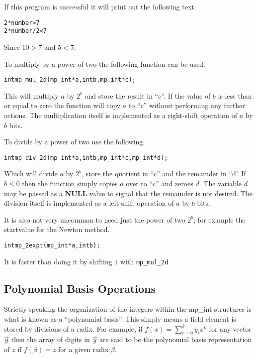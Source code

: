 \documentclass[synpaper]{book}
\begin{document}
If this program is successful it will print out the following text.

\begin{alltt}
2*number > 7
2*number/2 < 7
\end{alltt}

Since $10 > 7$ and $5 < 7$.

To multiply by a power of two the following function can be used.

\begin{alltt}
int mp_mul_2d(mp_int * a, int b, mp_int * c);
\end{alltt}

This will multiply $a$ by $2^b$ and store the result in ``c''.  If the value of $b$ is less than or equal to
zero the function will copy $a$ to ``c'' without performing any further actions.  The multiplication itself
is implemented as a right-shift operation of $a$ by $b$ bits.

To divide by a power of two use the following.

\begin{alltt}
int mp_div_2d (mp_int * a, int b, mp_int * c, mp_int * d);
\end{alltt}
Which will divide $a$ by $2^b$, store the quotient in ``c'' and the remainder in ``d'.  If $b \le 0$ then the
function simply copies $a$ over to ``c'' and zeroes $d$.  The variable $d$ may be passed as a \textbf{NULL}
value to signal that the remainder is not desired.  The division itself is implemented as a left-shift
operation of $a$ by $b$ bits.

It is also not very uncommon to need just the power of two $2^b$;  for example the startvalue for the Newton method.

\begin{alltt}
int mp_2expt(mp_int *a, int b);
\end{alltt}
It is faster than doing it by shifting $1$ with \texttt{mp\_mul\_2d}.

\subsection{Polynomial Basis Operations}

Strictly speaking the organization of the integers within the mp\_int structures is what is known as a
``polynomial basis''.  This simply means a field element is stored by divisions of a radix.  For example, if
$f(x) = \sum_{i=0}^{k} y_ix^k$ for any vector $\vec y$ then the array of digits in $\vec y$ are said to be
the polynomial basis representation of $z$ if $f(\beta) = z$ for a given radix $\beta$.
\end{document}
